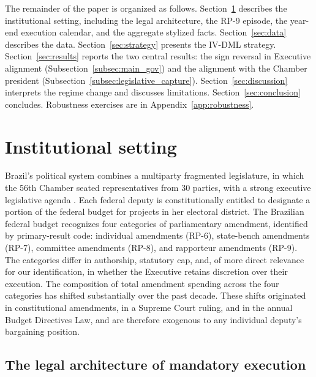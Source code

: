 \documentclass[pdflatex,sn-basic]{sn-jnl}
\begin{document}
The remainder of the paper is organized as follows. Section~\ref{sec:institutional} describes the institutional setting, including the legal architecture, the RP-9 episode, the year-end execution calendar, and the aggregate stylized facts. Section~\ref{sec:data} describes the data. Section~\ref{sec:strategy} presents the IV-DML strategy. Section~\ref{sec:results} reports the two central results: the sign reversal in Executive alignment (Subsection~\ref{subsec:main_gov}) and the alignment with the Chamber president (Subsection~\ref{subsec:legislative_capture}). Section~\ref{sec:discussion} interprets the regime change and discusses limitations. Section~\ref{sec:conclusion} concludes. Robustness exercises are in Appendix~\ref{app:robustness}.

\section{Institutional setting}
\label{sec:institutional}

Brazil's political system combines a multiparty fragmented legislature, in which the 56th Chamber seated representatives from 30 parties, with a strong executive legislative agenda \citep{Abranches1988,FigueiredoLimongi2000}. Each federal deputy is constitutionally entitled to designate a portion of the federal budget for projects in her electoral district. The Brazilian federal budget recognizes four categories of parliamentary amendment, identified by primary-result code: individual amendments (RP-6), state-bench amendments (RP-7), committee amendments (RP-8), and rapporteur amendments (RP-9). The categories differ in authorship, statutory cap, and, of more direct relevance for our identification, in whether the Executive retains discretion over their execution. The composition of total amendment spending across the four categories has shifted substantially over the past decade. These shifts originated in constitutional amendments, in a Supreme Court ruling, and in the annual Budget Directives Law, and are therefore exogenous to any individual deputy's bargaining position.

\subsection{The legal architecture of mandatory execution}
\label{subsec:legal_architecture}
\end{document}
